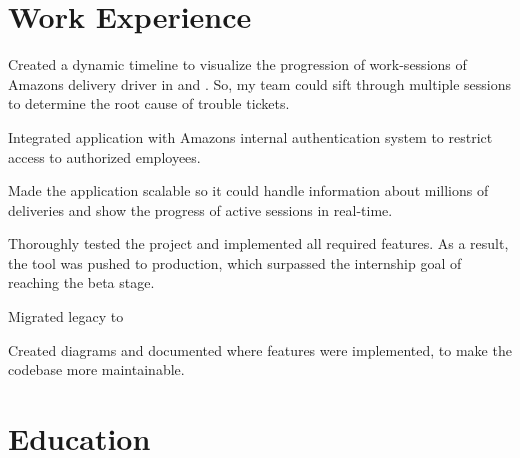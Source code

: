\documentclass[]{resume-openfont}
\begin{document}
\section{Work Experience}
\begin{tightemize}
    \item Created a dynamic timeline to visualize the progression of work-sessions of Amazon\textquotesingle{}s delivery driver in  and . So, my team could sift through multiple sessions to determine the root cause of trouble tickets.
    \item Integrated application with Amazon\textquotesingle{}s internal authentication system to restrict access to authorized employees.
    \item Made the application scalable so it could handle information about millions of deliveries and show the progress of active sessions in real-time.
    \item Thoroughly tested the project and implemented all required features. As a result, the tool was pushed to production, which surpassed the internship goal of reaching the beta stage.
\end{tightemize}
\sectionsep
{}
\begin{tightemize}
    \item Migrated legacy  to 
    \item Created  diagrams and documented where features were implemented, to make the codebase more maintainable.
\end{tightemize}
\sectionsep

%
%
\section{Education}

\hspace*{\fill}  \\
\hspace*{\fill}
\end{document}
